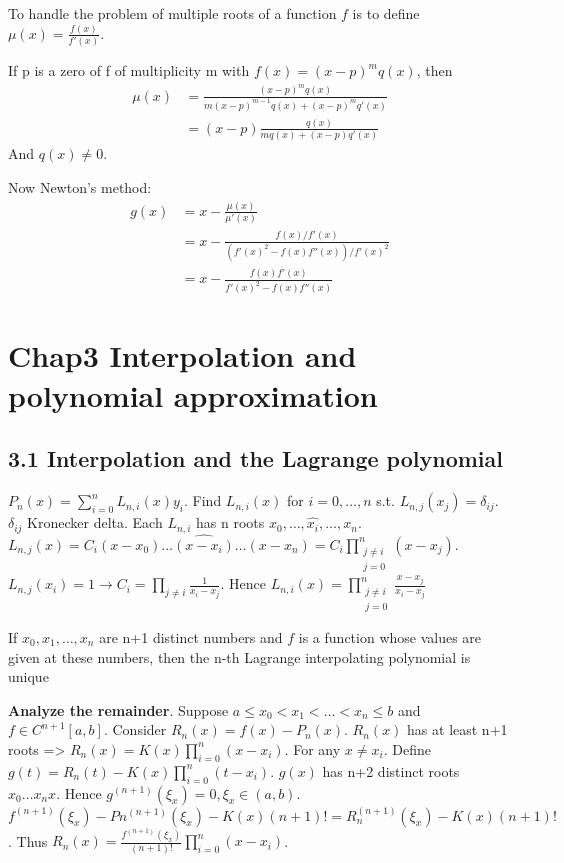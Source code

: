 \documentclass[11pt]{article}
\begin{document}
To handle the problem of multiple roots of a function \(f\) is to define
\(\mu(x)=\frac{f(x)}{f'(x)}\).

If p is a zero of f of multiplicity m with \(f(x)=(x-p)^mq(x
   )\), then
\begin{align*}
\mu(x)&=\frac{(x-p)^mq(x)}{m(x-p)^{m-1}q(x)+(x-p)^mq'(x)}\\
&=(x-p)\frac{q(x)}{mq(x)+(x-p)q'(x)}
\end{align*}
And \(q(x)\neq 0\).

Now Newton's method:
\begin{align*}
g(x)&=x-\frac{\mu(x)}{\mu'(x)}\\
&=x-\frac{f(x)/f'(x)}{(f'(x)^2-f(x)f''(x))/f'(x)^2}\\
&=x-\frac{f(x)f'(x)}{f'(x)^2-f(x)f''(x)}
\end{align*}
\section{Chap3 Interpolation and polynomial approximation}
\label{sec:org57d455a}
\subsection{3.1 Interpolation and the Lagrange polynomial}
\label{sec:org02344ac}
\(P_n(x)=\displaystyle\sum_{i=0}^nL_{n,i}(x)y_i\). Find \(L_{n,i}(x)\) for
\(i=0,\dots,n\) s.t. \(L_{n,j}(x_j)=\delta_{ij}\). \(\delta_{ij}\) Kronecker delta.
Each \(L_{n,i}\) has n roots \(x_0,\dots,\hat{x_i},\dots,x_n\).
\(L_{n,j}(x)=C_i(x-x_0)\dots\hat{(x-x_i)}\dots(x-x_n)=C_i \displaystyle
   \prod_{\substack{j\neq i\\j=0}}^n(x-x_j)\).
\(L_{n,j}(x_i)=1\to C_i=\displaystyle\prod_{j\neq i}\frac{1}{x_i-x_j}\).
Hence \(L_{n,i}(x)=\displaystyle\prod_{\substack{j\neq i\\j=0}}^n
   \frac{x-x_j}{x_i-x_j}\)

\begin{theorem}
If $x_0,x_1,\dots,x_n$ are n+1 distinct numbers and $f$ is a function whose values
are given at these numbers, then the n-th Lagrange interpolating polynomial 
is unique
\end{theorem}


\textbf{Analyze the remainder}. Suppose \(a\le x_0<x_1<\dots<x_n\le b\) and \(f\in
   C^{n+1}[a,b]\). Consider \(R_n(x)=f(x)-P_n(x)\).
\(R_n(x)\) has at least n+1 roots =>
\(R_n(x)=K(x)\displaystyle\prod_{i=0}^n(x-x_i)\).
For any \(x\neq x_i\). Define
\(g(t)=R_n(t)-K(x)\displaystyle\prod_{i=0}^n(t-x_i)\). \(g(x)\) has n+2 distinct
roots \(x_0\dots x_n x\). Hence \(g^{(n+1)}(\xi_x)=0,\xi_x\in(a,b)\).
\(f^{(n+1)}(\xi_x)-Pn^{(n+1)}(\xi_x)-K(x)(n+1)!=R_n^{(n+1)}(\xi_x)-K(x)(n+1)!\).
Thus
\(R_n(x)=\frac{f^{(n+1)}(\xi_x)}{(n+1)!}\displaystyle\prod_{i=0}^n(x-x_i)\).
\end{document}
